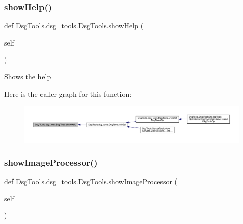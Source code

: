 \subsubsection{\texorpdfstring{show\+Help()}{showHelp()}}
{\footnotesize\ttfamily def Dsg\+Tools.\+dsg\+\_\+tools.\+Dsg\+Tools.\+show\+Help (\begin{DoxyParamCaption}\item[{}]{self }\end{DoxyParamCaption})}

\begin{DoxyVerb}Shows the help
\end{DoxyVerb}
 Here is the caller graph for this function\+:
\nopagebreak
\begin{figure}[H]
\begin{center}
\leavevmode
\includegraphics[width=350pt]{class_dsg_tools_1_1dsg__tools_1_1_dsg_tools_a11b6c84296f2542f676586db2125d2d7_icgraph}
\end{center}
\end{figure}
\mbox{\label{class_dsg_tools_1_1dsg__tools_1_1_dsg_tools_a183fb5ffe42d20a7d8ee6d7487c47d11}} 
\subsubsection{\texorpdfstring{show\+Image\+Processor()}{showImageProcessor()}}
{\footnotesize\ttfamily def Dsg\+Tools.\+dsg\+\_\+tools.\+Dsg\+Tools.\+show\+Image\+Processor (\begin{DoxyParamCaption}\item[{}]{self }\end{DoxyParamCaption})}


